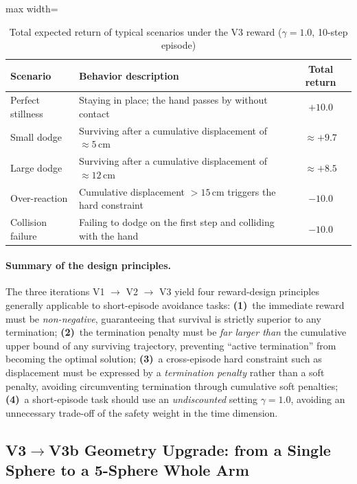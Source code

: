 \begin{table}[htbp]
  \centering
  \caption{Total expected return of typical scenarios under the V3 reward ($\gamma = 1.0$, 10-step episode)}
  \label{tab:v3_returns}
  \footnotesize
  \begin{adjustbox}{max width=\textwidth}
  \begin{tabular}{@{}llc@{}}
    \toprule
    Scenario & Behavior description & Total return \\
    \midrule
    Perfect stillness & Staying in place; the hand passes by without contact & $+10.0$ \\
    Small dodge & Surviving after a cumulative displacement of $\approx 5$\,cm & $\approx +9.7$ \\
    Large dodge & Surviving after a cumulative displacement of $\approx 12$\,cm & $\approx +8.5$ \\
    Over-reaction & Cumulative displacement $> 15$\,cm triggers the hard constraint & $-10.0$ \\
    Collision failure & Failing to dodge on the first step and colliding with the hand & $-10.0$ \\
    \bottomrule
  \end{tabular}
  \end{adjustbox}
\end{table}

\paragraph{Summary of the design principles.} The three iterations V1 $\to$ V2 $\to$ V3 yield four reward-design principles generally applicable to short-episode avoidance tasks: \textbf{(1)}~the immediate reward must be \emph{non-negative}, guaranteeing that survival is strictly superior to any termination; \textbf{(2)}~the termination penalty must be \emph{far larger than} the cumulative upper bound of any surviving trajectory, preventing ``active termination'' from becoming the optimal solution; \textbf{(3)}~a cross-episode hard constraint such as displacement must be expressed by a \emph{termination penalty} rather than a soft penalty, avoiding circumventing termination through cumulative soft penalties; \textbf{(4)}~a short-episode task should use an \emph{undiscounted} setting $\gamma = 1.0$, avoiding an unnecessary trade-off of the safety weight in the time dimension.

\subsection{V3$\to$V3b Geometry Upgrade: from a Single Sphere to a 5-Sphere Whole Arm}\label{sec:v3b_geometry}

